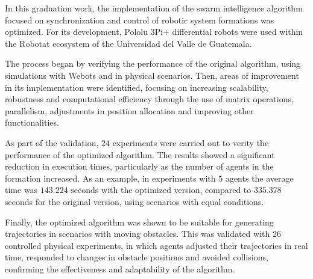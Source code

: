 In this graduation work, the implementation of the swarm intelligence algorithm focused on synchronization and control of robotic system formations was optimized. For its development, Pololu 3Pi+ differential robots were used within the Robotat ecosystem of the Universidad del Valle de Guatemala.

The process began by verifying the performance of the original algorithm, using simulations with Webots and in physical scenarios. Then, areas of improvement in its implementation were identified, focusing on increasing scalability, robustness and computational efficiency through the use of matrix operations, parallelism, adjustments in position allocation and improving other functionalities.

As part of the validation, $24$ experiments were carried out to verity the performance of the optimized algorithm. The results showed a significant reduction in execution times, particularly as the number of agents in the formation increased. As an example, in experiments with $5$ agents the average time was $143.224$ seconds with the optimized version, compared to $335.378$ seconds for the original version, using scenarios with equal conditions.

Finally, the optimized algorithm was shown to be suitable for generating trajectories in scenarios with moving obstacles. This was validated with $26$ controlled physical experiments, in which agents adjusted their trajectories in real time, responded to changes in obstacle positions and avoided collisions, confirming the effectiveness and adaptability of the algorithm.